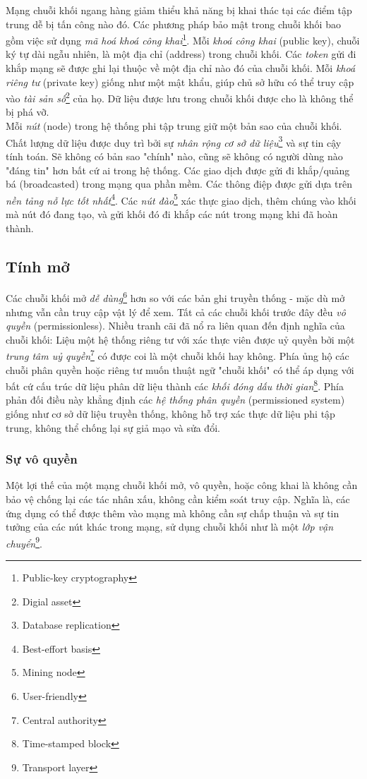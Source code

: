 Mạng chuỗi khối ngang hàng giảm thiểu khả năng bị khai thác tại các điểm tập trung dễ bị tấn công nào đó. Các phương pháp bảo mật trong chuỗi khối bao gồm việc sử dụng \textit{mã hoá khoá công khai}\footnote{Public-key cryptography}. Mỗi \textit{khoá công khai} (public key), chuỗi ký tự dài ngẫu nhiên, là một địa chỉ (address) trong chuỗi khối. Các \textit{token} gửi đi khắp mạng sẽ được ghi lại thuộc về một địa chỉ nào đó của chuỗi khối. Mỗi \textit{khoá riêng tư} (private key) giống như một mật khẩu, giúp chủ sở hữu có thể truy cập vào \textit{tài sản số}\footnote{Digial asset} của họ. Dữ liệu được lưu trong chuỗi khối được cho là không thể bị phá vỡ.\\

Mỗi \textit{nút} (node) trong hệ thống phi tập trung giữ một bản sao của chuỗi khối. Chất lượng dữ liệu được duy trì bởi sự \textit{nhân rộng cơ sở dữ liệu}\footnote{Database replication} và sự tin cậy tính toán. Sẽ không có bản sao "chính" nào, cũng sẽ không có người dùng nào "đáng tin" hơn bất cứ ai trong hệ thống. Các giao dịch được gửi đi khắp/quảng bá (broadcasted) trong mạng qua phần mềm. Các thông điệp được gửi dựa trên \textit{nền tảng nỗ lực tốt nhất}\footnote{Best-effort basis}. Các \textit{nút đào}\footnote{Mining node} xác thực giao dịch, thêm chúng vào khối mà nút đó đang tạo, và gửi khối đó đi khắp các nút trong mạng khi đã hoàn thành.

\subsection{Tính mở}

Các chuỗi khối mở \textit{dễ dùng}\footnote{User-friendly} hơn so với các bản ghi truyền thống - mặc dù mở nhưng vẫn cần truy cập vật lý để xem. Tất cả các chuỗi khối trước đây đều \textit{vô quyền} (permissionless). Nhiều tranh cãi đã nổ ra liên quan đến định nghĩa của chuỗi khối: Liệu một hệ thống riêng tư với xác thực viên được uỷ quyền bởi một \textit{trung tâm uỷ quyền}\footnote{Central authority} có được coi là một chuỗi khối hay không. Phía ủng hộ các chuỗi phân quyền hoặc riêng tư muốn thuật ngữ "chuỗi khối" có thể áp dụng với bất cứ cấu trúc dữ liệu phân dữ liệu thành các \textit{khối đóng dấu thời gian}\footnote{Time-stamped block}. Phía phản đối điều này khẳng định các \textit{hệ thống phân quyền} (permissioned system) giống như cơ sở dữ liệu truyền thống, không hỗ trợ xác thực dữ liệu phi tập trung, không thể chống lại sự giả mạo và sửa đổi.

\subsubsection{Sự vô quyền}
Một lợi thế của một mạng chuỗi khối mở, vô quyền, hoặc công khai là không cần bảo vệ chống lại các tác nhân xấu, không cần kiểm soát truy cập. Nghĩa là, các ứng dụng có thể được thêm vào mạng mà không cần sự chấp thuận và sự tin tưởng của các nút khác trong mạng, sử dụng chuỗi khối như là một \textit{lớp vận chuyển}\footnote{Transport layer}.


